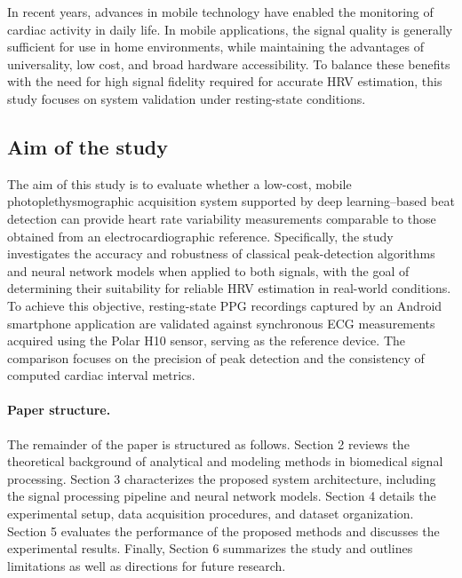 \documentclass{citask}
\begin{document}
In recent years, advances in mobile technology have enabled the monitoring of cardiac activity in daily life. In mobile applications, the signal quality is generally sufficient for use in home environments, while maintaining the advantages of universality, low cost, and broad hardware accessibility. To balance these benefits with the need for high signal fidelity required for accurate HRV estimation, this study focuses on system validation under resting-state conditions.


\subsection{Aim of the study}
The aim of this study is to evaluate whether a low-cost, mobile photoplethysmographic acquisition system supported by deep learning–based beat detection can provide heart rate variability measurements comparable to those obtained from an electrocardiographic reference. Specifically, the study investigates the accuracy and robustness of classical peak-detection algorithms and neural network models when applied to both signals, with the goal of determining their suitability for reliable HRV estimation in real-world conditions. To achieve this objective, resting-state PPG recordings captured by an Android smartphone application are validated against synchronous ECG measurements acquired using the Polar H10 sensor, serving as the reference device. The comparison focuses on the precision of peak detection and the consistency of computed cardiac interval metrics.

\paragraph*{Paper structure.}
The remainder of the paper is structured as follows. Section 2 reviews the theoretical background of analytical and modeling methods in biomedical signal processing. Section 3 characterizes the proposed system architecture, including the signal processing pipeline and neural network models. Section 4 details the experimental setup, data acquisition procedures, and dataset organization. Section 5 evaluates the performance of the proposed methods and discusses the experimental results. Finally, Section 6 summarizes the study and outlines limitations as well as directions for future research.

\end{document}
